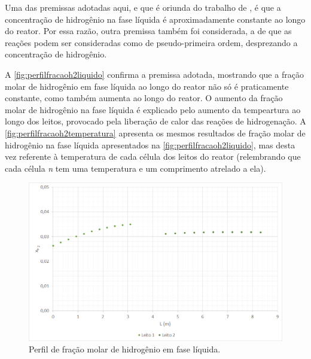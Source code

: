 Uma das premissas adotadas aqui, e que é oriunda do trabalho de
, é que a concentração de hidrogênio na
fase líquida é aproximadamente constante ao longo do reator. Por essa razão,
outra premissa também foi considerada, a de que as reações podem ser
consideradas como de pseudo-primeira ordem, desprezando a concentração de
hidrogênio.

A \autoref{fig:perfilfracaoh2liquido} confirma a premissa adotada, mostrando
que a fração molar de hidrogênio em fase líquida ao longo do reator não só é
praticamente constante, como também aumenta ao longo do reator. O aumento da
fração molar de hidrogênio na fase líquida é explicado pelo aumento da
tempeartura ao longo dos leitos, provocado pela liberação de calor das reações
de hidrogenação. A \autoref{fig:perfilfracaoh2temperatura} apresenta os
mesmos resultados de fração molar de hidrogênio na fase líquida
apresentados na \autoref{fig:perfilfracaoh2liquido}, mas desta vez referente à
temperatura de cada célula dos leitos do reator (relembrando que cada célula
\emph{n} tem uma temperatura e um comprimento atrelado a ela).

\begin{figure}[htb]
\centering \includegraphics[scale=0.4]{images/Chap4/perfilfracaoh2liquido.png}
\caption{Perfil de fração molar de hidrogênio em fase líquida.}
\label{fig:perfilfracaoh2liquido}
\end{figure}

